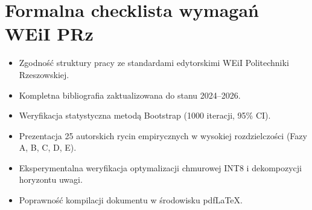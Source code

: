 \documentclass[12pt,a4paper,twoside]{report}
\begin{document}
\chapter{Formalna checklista wymagań WEiI PRz}\label{app:check}
\begin{itemize}[leftmargin=*]
  \item[$\boxtimes$] Zgodność struktury pracy ze standardami edytorskimi WEiI Politechniki Rzeszowskiej.
  \item[$\boxtimes$] Kompletna bibliografia zaktualizowana do stanu 2024--2026.
  \item[$\boxtimes$] Weryfikacja statystyczna metodą Bootstrap (1000 iteracji, 95\% CI).
  \item[$\boxtimes$] Prezentacja 25 autorskich rycin empirycznych w wysokiej rozdzielczości (Fazy A, B, C, D, E).
  \item[$\boxtimes$] Eksperymentalna weryfikacja optymalizacji chmurowej INT8 i dekompozycji horyzontu uwagi.
  \item[$\boxtimes$] Poprawność kompilacji dokumentu w środowisku pdfLaTeX.
\end{itemize}
\end{document}
